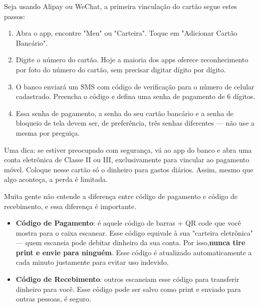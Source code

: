 


Seja usando Alipay ou WeChat, a primeira vinculação do cartão segue estes passos:

\begin{enumerate}
  \item Abra o app, encontre "Meu" ou "Carteira". Toque em "Adicionar Cartão Bancário".
  \item Digite o número do cartão. Hoje a maioria dos apps oferece reconhecimento por foto do número do cartão, sem precisar digitar dígito por dígito.
  \item O banco enviará um SMS com código de verificação para o número de celular cadastrado. Preencha o código e defina uma senha de pagamento de 6 dígitos.
  \item Essa senha de pagamento, a senha do seu cartão bancário e a senha de bloqueio de tela devem ser, de preferência, três senhas diferentes — não use a mesma por preguiça.
\end{enumerate}

Uma dica: se estiver preocupado com segurança, vá ao app do banco e abra uma conta eletrônica de Classe II ou III, exclusivamente para vincular ao pagamento móvel. Coloque nesse cartão só o dinheiro para gastos diários. Assim, mesmo que algo aconteça, a perda é limitada.


Muita gente não entende a diferença entre código de pagamento e código de recebimento, e essa diferença é importante.

\begin{itemize}
  \item \textbf{Código de Pagamento}: é aquele código de barras + QR code que você mostra para o caixa escanear. Esse código equivale à sua "carteira eletrônica" — quem escaneia pode debitar dinheiro da sua conta. Por isso,\textbf{nunca tire print e envie para ninguém}. Esse código é atualizado automaticamente a cada minuto justamente para evitar uso indevido.
  \item \textbf{Código de Recebimento}: outros escaneiam esse código para transferir dinheiro para você. Esse código pode ser salvo como print e enviado para outras pessoas, é seguro.
\end{itemize}


